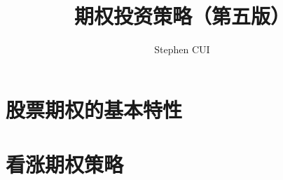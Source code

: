 \documentclass[openany]{book}
\title{期权投资策略（第五版）}
\author{Stephen CUI}
\begin{document}
\maketitle
\frontmatter
\tableofcontents
\mainmatter
\part{股票期权的基本特性}
\part{看涨期权策略}
\end{document}

